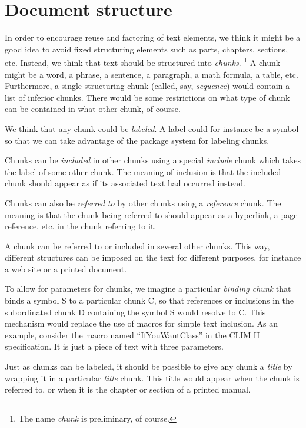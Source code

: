 \chapter{Document structure}
\label{chap-document-structure}

In order to encourage reuse and factoring of text elements, we think
it might be a good idea to avoid fixed structuring elements such as
parts, chapters, sections, etc.  Instead, we think that text should be
structured into \emph{chunks}.%
\footnote{The name \emph{chunk} is preliminary, of course.}
A chunk might be a word, a phrase, a sentence, a paragraph, a math
formula, a table, etc.  Furthermore, a single structuring chunk
(called, say, \emph{sequence}) would contain a list of inferior
chunks.  There would be some restrictions on what type of chunk can be
contained in what other chunk, of course.  

We think that any chunk could be \emph{labeled}.  A label could for
instance be a \commonlisp{} symbol so that we can take advantage of the
package system for labeling chunks.

Chunks can be \emph{included} in other chunks using a special
\emph{include} chunk which takes the label of some other chunk.
The meaning of inclusion is that the included chunk should appear as
if its associated text had occurred instead.  

Chunks can also be \emph{referred to} by other chunks using a
\emph{reference} chunk.  The meaning is that the chunk being referred
to should appear as a hyperlink, a page reference, etc. in the chunk
referring to it. 

A chunk can be referred to or included in several other chunks.  This
way, different structures can be imposed on the text for different
purposes, for instance a web site or a printed document. 

To allow for parameters for chunks, we imagine a particular
\emph{binding chunk} that binds a symbol S to a particular chunk C, so
that references or inclusions in the subordinated chunk D containing
the symbol S would resolve to C.  This mechanism would replace the use
of macros for simple text inclusion.  As an example, consider the
macro named ``IfYouWantClass'' in the CLIM II specification.  It is
just a piece of text with three parameters. 

Just as chunks can be labeled, it should be possible to give any chunk
a \emph{title} by wrapping it in a particular \emph{title} chunk.
This title would appear when the chunk is referred to, or when it is
the chapter or section of a printed manual.

